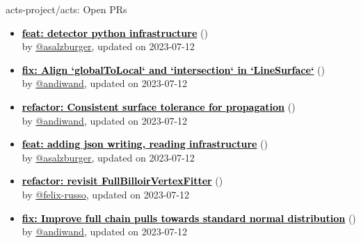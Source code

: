 \begin{frame}[allowframebreaks]{ acts-project/acts: Open PRs
}

  \begin{itemize}
    
    
    \item\iss\textbf{\href{https://github.com/acts-project/acts/pull/2288}{\textcolor{black}{feat: detector python infrastructure}}}
    (\href{https://github.com/acts-project/acts/pull/2288}{}) \\
    by \href{https://github.com/asalzburger}{@asalzburger}, updated on 2023-07-12

    \item\iss\textbf{\href{https://github.com/acts-project/acts/pull/2287}{\textcolor{black}{fix: Align `globalToLocal` and `intersection` in `LineSurface`}}}
    (\href{https://github.com/acts-project/acts/pull/2287}{}) \\
    by \href{https://github.com/andiwand}{@andiwand}, updated on 2023-07-12

    \item\iss\textbf{\href{https://github.com/acts-project/acts/pull/2292}{\textcolor{black}{refactor: Consistent surface tolerance for propagation}}}
    (\href{https://github.com/acts-project/acts/pull/2292}{}) \\
    by \href{https://github.com/andiwand}{@andiwand}, updated on 2023-07-12

    \item\iss\textbf{\href{https://github.com/acts-project/acts/pull/2283}{\textcolor{black}{feat: adding json writing, reading infrastructure}}}
    (\href{https://github.com/acts-project/acts/pull/2283}{}) \\
    by \href{https://github.com/asalzburger}{@asalzburger}, updated on 2023-07-12

    \item\iss\textbf{\href{https://github.com/acts-project/acts/pull/2196}{\textcolor{black}{refactor: revisit FullBilloirVertexFitter}}}
    (\href{https://github.com/acts-project/acts/pull/2196}{}) \\
    by \href{https://github.com/felix-russo}{@felix-russo}, updated on 2023-07-12

    \item\iss\textbf{\href{https://github.com/acts-project/acts/pull/2086}{\textcolor{black}{fix: Improve full chain pulls towards standard normal distribution}}}
    (\href{https://github.com/acts-project/acts/pull/2086}{}) \\
    by \href{https://github.com/andiwand}{@andiwand}, updated on 2023-07-12


\end{itemize}
\end{frame}
